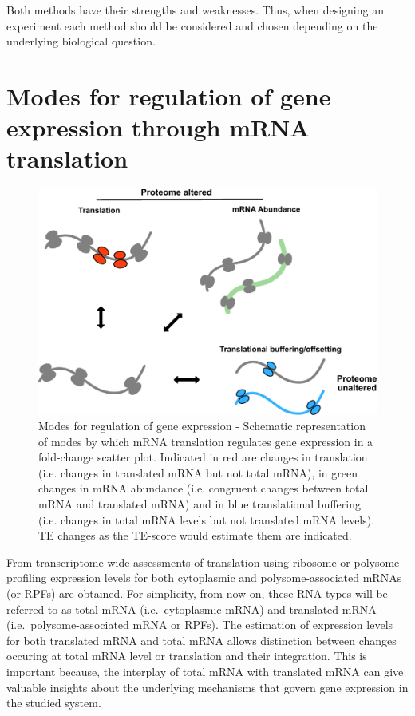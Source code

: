 \documentclass[12pt,openany]{book}
\begin{document}
Both methods have their strengths and weaknesses. Thus, when designing
an experiment each method should be considered and chosen depending on
the underlying biological question. \newline
\section{Modes for regulation of gene expression through mRNA translation} \label{modes}

\begin{figure}
  \includegraphics{./figures/geneModes_MRNA.pdf}
  \caption{Modes for regulation of gene expression - Schematic representation of modes by which mRNA translation regulates gene expression in a fold-change scatter plot. Indicated in red are changes in translation (i.e. changes in translated mRNA but not total mRNA), in green changes in mRNA abundance (i.e. congruent changes between total mRNA and translated mRNA) and in blue translational buffering (i.e. changes in total mRNA levels but not translated mRNA levels). TE changes as the TE-score would estimate them are indicated.\label{fig:modes}}
\end{figure}

From transcriptome-wide assessments of translation using ribosome or
polysome profiling expression levels for both cytoplasmic and
polysome-associated mRNAs (or RPFs) are obtained. For simplicity, from
now on, these RNA types will be referred to as total mRNA
(i.e.~cytoplasmic mRNA) and translated mRNA (i.e.~polysome-associated
mRNA or RPFs). The estimation of expression levels for both translated
mRNA and total mRNA allows distinction between changes occuring at total
mRNA level or translation and their integration. This is important
because, the interplay of total mRNA with translated mRNA can give
valuable insights about the underlying mechanisms that govern gene
expression in the studied system.
\end{document}
